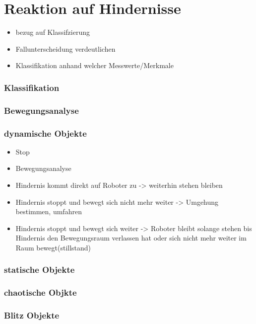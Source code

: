 	\chapter{Reaktion auf Hindernisse}
	\begin{itemize}
	\item bezug auf Klassifzierung
	\item Fallunterscheidung verdeutlichen
	\item Klassifikation anhand welcher Messwerte/Merkmale
	\end{itemize}
	\subsection{Klassifikation}
	\subsection{Bewegungsanalyse}
	\subsection{dynamische Objekte}
			\begin{itemize}
				\item Stop
				\item Bewegungsanalyse
				\item Hindernis kommt direkt auf Roboter zu -> weiterhin stehen bleiben
				\item Hindernis stoppt und bewegt sich nicht mehr weiter -> Umgehung bestimmen, umfahren
				\item Hindernis stoppt und bewegt sich weiter -> Roboter bleibt solange stehen bis Hindernis den Bewegungsraum verlassen hat oder sich nicht mehr weiter im Raum bewegt(stillstand) 
			\end{itemize}
	\subsection{statische Objekte}
	\subsection{chaotische Objkte}
	\subsection{Blitz Objekte}
